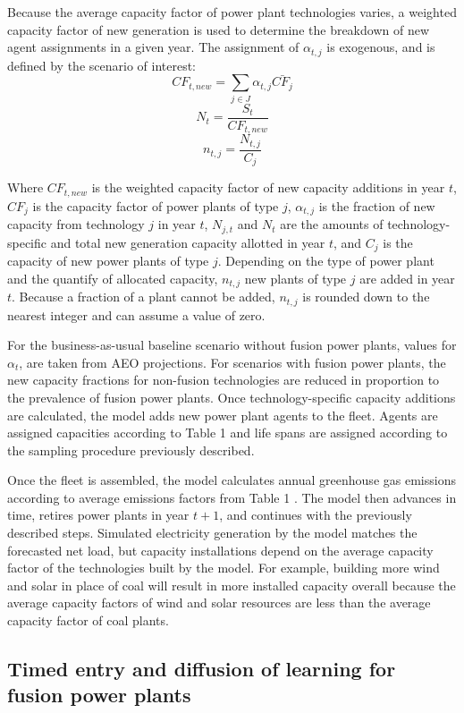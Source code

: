 \documentclass[review]{elsarticle}
\begin{document}
Because the average capacity factor of power plant technologies varies, a weighted capacity factor of new generation is used to determine the breakdown of new agent assignments in a given year. The assignment of $\alpha_{t,j}$ is exogenous, and is defined by the scenario of interest:
$$ CF_{t,new} = \sum_{j \in J} \alpha_{t,j} \bar{CF_{j}}$$ $$N_t=\frac{S_t}{CF_{t,new}}$$ 
$$n_{t,j} = \frac{N_{t,j}}{C_j}$$

Where $CF_{t,new}$ is the weighted capacity factor of new capacity additions in year $t$, $CF_j$ is the capacity factor of power plants of type $j$, $\alpha_{t, j}$ is the fraction of new capacity from technology $j$ in year $t$, $N_{j,t}$ and $N_t$ are the amounts of technology-specific and total new generation capacity allotted in year $t$, and $C_j$ is the capacity of new power plants of type $j$. Depending on the type of power plant and the quantify of allocated capacity, $n_{t,j}$ new plants of type $j$ are added in year $t$. Because a fraction of a plant cannot be added, $n_{t,j}$ is rounded down to the nearest integer and can assume a value of zero.

For the business-as-usual baseline scenario without fusion power plants, values for $\alpha_t$, are taken from AEO projections. For scenarios with fusion power plants, the new capacity fractions for non-fusion technologies are reduced in proportion to the prevalence of fusion power plants. Once technology-specific capacity additions are calculated, the model adds new power plant agents to the fleet. Agents are assigned capacities according to Table 1 and life spans are assigned according to the sampling procedure previously described. 

Once the fleet is assembled, the model calculates annual greenhouse gas emissions according to average emissions factors from Table 1 \citep{IPCC2012}. The model then advances in time, retires power plants in year $t+1$, and continues with the previously described steps. Simulated electricity generation by the model matches the forecasted net load, but capacity installations depend on the average capacity factor of the technologies built by the model. For example, building more wind and solar in place of coal will result in more installed capacity overall because the average capacity factors of wind and solar resources are less than the average capacity factor of coal plants.

\subsection{Timed entry and diffusion of learning for fusion power plants}
\end{document}
